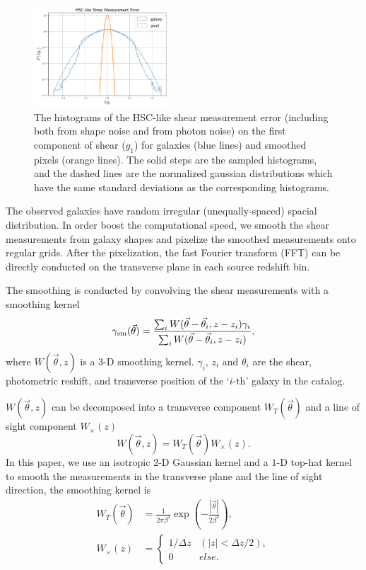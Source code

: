\documentclass[twocolumn]{aastex62}
\begin{document}
\begin{figure}[!t]
 \centering
 \includegraphics[width=0.45\textwidth]{shapeMeasurementError-HSCY1.pdf}
 \caption{The histograms of the HSC-like shear measurement error (including both from shape noise and from photon noise) 
        on the first component of shear ($g_1$) for galaxies (blue lines) and smoothed pixels (orange lines). The solid
        steps are the sampled histograms, and the dashed lines are the normalized gaussian distributions which have the
        same standard deviations as the corresponding histograms.}
 \label{fig:mass-redshift}
\end{figure}

The observed galaxies have random irregular (unequally-spaced) spacial distribution. In order boost the computational
speed, we smooth the shear measurements from galaxy shapes and pixelize the smoothed measurements onto regular grids.
After the pixelization, the fast Fourier transform (FFT) can be directly conducted on the transverse plane in each
source redshift bin.

The smoothing is conducted by convolving the shear measurements with a smoothing kernel
\begin{equation}
\gamma_{\rm{sm}} (\vec{\theta})  = \frac{\sum_i  W(\vec{\theta}-\vec{{\theta}}_i,z-z_i) \gamma_i}{\sum_i W(\vec{\theta}-\vec{{\theta}}_i,z-z_i) },
\end{equation}
where $W(\vec{\theta},z)$ is a $3$-D smoothing kernel. $\gamma_i$, $z_i$ and $\theta_i$ are the shear,
photometric reshift, and transverse position of the `$i$-th' galaxy in the catalog.

$W(\vec{\theta},z)$ can be decomposed into a transverse component $W_T(\vec{\theta})$ and a line of sight component
$W_\times(z)$
\begin{equation}
W(\vec{\theta},z)=W_T(\vec{\theta}) W_\times (z).
\end{equation}
In this paper, we use an isotropic $2$-D Gaussian kernel and a $1$-D top-hat kernel to smooth the measurements in the
transverse plane and the line of sight direction, the smoothing kernel is
\begin{equation}
\begin{split}
W_T(\vec{\theta}) &=\frac{1}{2\pi\beta^2}\exp(-\frac{|\vec{\theta}|}{2\beta^2}),\\
W_\times (z) &=
\begin{cases}
1/\Delta z& (|z|<\Delta z/2),\\
0& else.
\end{cases}
\end{split}
\end{equation}
\end{document}
